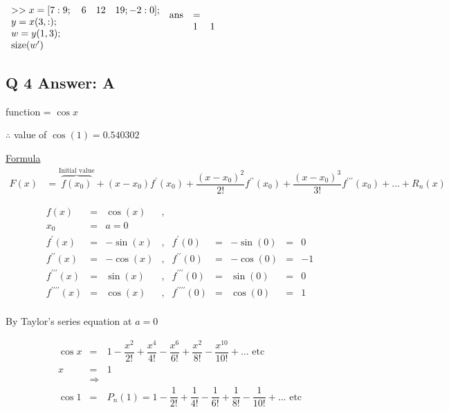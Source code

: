 \documentclass[a4paper,11pt]{article}
\begin{document}
\(\begin{array}{l}
    >> x=[7:9; \quad 6 \quad 12 \quad 19;-2:0]; \\
    y=x(3,:); \\
    w=y(1,3); \\
    \text{size}(w^\prime)
\end{array} \\ [5mm]
\begin{array}{lll} 
    \text{ans} & = & \\
        & 1 & 1 \\ [5mm]
 
\end{array}\)

\subsection*{Q 4 Answer: A}

function = $\cos x$

$\therefore$ value of $\cos(1) = 0.540302$

\underline{Formula}
\begin{align*}
    F(x) &= \overbrace{f(x_0)}^{\text{Initial value}} + (x-x_0) f^\prime(x_0) + \dfrac{(x-x_0)^2}{2!}  f^{\prime\prime}(x_0) + \dfrac{(x-x_0)^3}{3!} f^{\prime\prime\prime}(x_0) + \ldots + R_n(x)
\end{align*}

\[\begin{array}{rrrrrrrrr}
    f(x) &=& \cos(x) &,& && \\
    x_0 &=& a = 0   & &  && \\
    f^{\prime}(x) &=& -\sin(x) &,& f^\prime(0) &=& -\sin(0) &=& 0 \\
    f^{\prime\prime}(x) &=& -\cos(x) &,& f^{\prime\prime}(0) &=& -\cos(0) &=& -1 \\
    f^{\prime\prime\prime}(x) &=& \sin(x) &,& f^{\prime\prime\prime}(0) &=& \sin(0) &=& 0 \\
    f^{\prime\prime\prime\prime}(x) &=& \cos(x) &,& f^{\prime\prime\prime\prime}(0) &=& \cos(0) &=& 1 \\
\end{array}\]


By Taylor's series equation at $a = 0$

\[\begin{array}{cll}
    \cos x &=& 1 - \dfrac{x^2}{2!} + \dfrac{x^4}{4!} - \dfrac{x^6}{6!} + \dfrac{x^2}{8!} - \dfrac{x^{10}}{10!} + \ldots \text{ etc} \\
    x &=& 1 \\
    & \Rightarrow &\\
    \cos 1 &=& P_n(1) = 1 - \dfrac{1}{2!} + \dfrac{1}{4!} - \dfrac{1}{6!} + \dfrac{1}{8!} - \dfrac{1}{10!} + \ldots \text{ etc}
\end{array}\]
\end{document}

